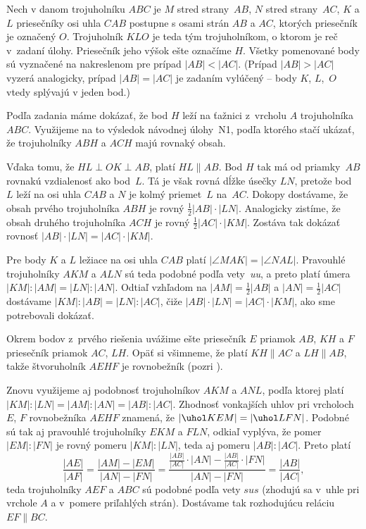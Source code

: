 {%
Nech v danom trojuholníku $ABC$ je
$M$ stred strany~$AB$, $N$ stred strany~$AC$, $K$ a $L$
priesečníky osi uhla $CAB$ postupne s osami strán $AB$ a $AC$,
ktorých priesečník je označený $O$. Trojuholník $KLO$ je teda tým trojuholníkom,
o ktorom je reč v~zadaní úlohy. Priesečník jeho výšok ešte
označíme $H$.
Všetky pomenované body sú vyznačené na \obr{}
nakreslenom pre prípad $|AB|<|AC|$. (Prípad $|AB|>|AC|$ vyzerá
analogicky, prípad $|AB|=|AC|$ je zadaním vylúčený -- body $K$, $L$,~$O$
vtedy splývajú v jeden bod.)
%

Podľa zadania máme dokázať, že bod $H$ leží na ťažnici
z~vrcholu $A$ trojuholníka~$ABC$. Využijeme na to výsledok návodnej
úlohy~N1, podľa ktorého stačí ukázať, že trojuholníky $ABH$ a $ACH$
majú rovnaký obsah.

Vďaka tomu, že $HL\perp OK\perp AB$, platí $HL \parallel AB$. Bod
$H$ tak má od priamky~$AB$ rovnakú vzdialenosť ako bod~$L$. Tá je
však rovná dĺžke úsečky $LN$, pretože bod~$L$ leží na osi uhla
$CAB$ a $N$ je kolmý priemet~$L$ na~$AC$. Dokopy dostávame, že
obsah prvého trojuholníka $ABH$ je rovný $\frac12|AB|\cdot|LN|$.
Analogicky zistíme, že obsah druhého trojuholníka $ACH$
je rovný $\frac12|AC|\cdot|KM|$.
Zostáva tak dokázať rovnosť ${|AB|\cdot|LN|}={|AC|\cdot|KM|}$.

Pre body $K$ a $L$ ležiace na osi uhla $CAB$ platí $|\angle
MAK| = |\angle NAL|$.
Pravouhlé trojuholníky $AKM$ a $ALN$ sú teda podobné podľa vety~\emph{uu},
a preto platí úmera $|KM|:|AM|=|LN|:|AN|$. Odtiaľ vzhľadom na $|AM|=\frac12|AB|$ a $|AN| =\frac12|AC|$ dostávame
$|KM|:|AB|=|LN|:|AC|$, čiže $|AB|\cdot|LN|=|AC|\cdot|KM|$, ako
sme potrebovali dokázať.

    \Jres
Okrem bodov z~prvého riešenia uvážime ešte priesečník $E$ priamok
$AB$, $KH$ a $F$ priesečník priamok $AC$, $LH$. Opäť si
všimneme, že platí $KH\parallel AC$ a $LH\parallel AB$,
takže štvoruholník $AEHF$ je rovnobežník (pozri \obr{}).
%

Znovu využijeme aj podobnosť trojuholníkov $AKM$ a $ANL$, podľa ktorej
platí $|KM|:|LN|=|AM|:|AN|=|AB|:|AC|$. Zhodnosť vonkajších uhlov pri
vrcholoch $E$, $F$ rovnobežníka $AEHF$ znamená, že $|\uhol KEM|=|\uhol
LFN|$. Podobné sú tak aj pravouhlé trojuholníky $EKM$ a $FLN$,
odkiaľ vyplýva, že pomer $|EM|:|FN|$ je rovný pomeru
$|KM|:|LN|$, teda aj pomeru $|AB|:|AC|$. Preto platí
$$
\frac{|AE|}{|AF|} =\frac{|AM| - |EM|}{|AN| - |FN|}=
\frac{\frac{|AB|}{|AC|}\cdot|AN|-\frac{|AB|}{|AC|}\cdot|FN|}{|AN|-|FN|}
= \frac{|AB|}{|AC|},
$$
teda trojuholníky $AEF$ a $ABC$ sú podobné podľa vety $sus$
(zhodujú sa v~uhle pri vrchole $A$ a v~pomere priľahlých strán).
Dostávame tak rozhodujúcu reláciu $EF \parallel{BC}$.


}
